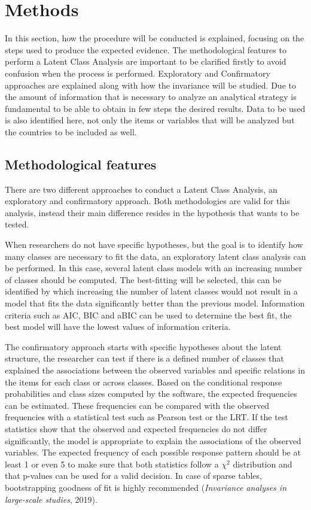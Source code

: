 \documentclass[12pt,a4paper,oneside]{reedthesis}
\begin{document}
\clearpage

\hypertarget{methods}{%
\chapter{Methods}\label{methods}}

In this section, how the procedure will be conducted is explained, focusing on the steps used to produce the expected evidence. The methodological features to perform a Latent Class Analysis are important to be clarified firstly to avoid confusion when the process is performed. Exploratory and Confirmatory approaches are explained along with how the invariance will be studied. Due to the amount of information that is necessary to analyze an analytical strategy is fundamental to be able to obtain in few steps the desired results. Data to be used is also identified here, not only the items or variables that will be analyzed but the countries to be included as well.

\hypertarget{methodological-features}{%
\section{Methodological features}\label{methodological-features}}

There are two different approaches to conduct a Latent Class Analysis, an exploratory and confirmatory approach. Both methodologies are valid for this analysis, instead their main difference resides in the hypothesis that wants to be tested.

When researchers do not have specific hypotheses, but the goal is to identify how many classes are necessary to fit the data, an exploratory latent class analysis can be performed. In this case, several latent class models with an increasing number of classes should be computed. The best-fitting will be selected, this can be identified by which increasing the number of latent classes would not result in a model that fits the data significantly better than the previous model. Information criteria such as AIC, BIC and aBIC can be used to determine the best fit, the best model will have the lowest values of information criteria.

The confirmatory approach starts with specific hypotheses about the latent structure, the researcher can test if there is a defined number of classes that explained the associations between the observed variables and specific relations in the items for each class or across classes. Based on the conditional response probabilities and class sizes computed by the software, the expected frequencies can be estimated. These frequencies can be compared with the observed frequencies with a statistical test such as Pearson test or the LRT. If the test statistics show that the observed and expected frequencies do not differ significantly, the model is appropriate to explain the associations of the observed variables. The expected frequency of each possible response pattern should be at least 1 or even 5 to make sure that both statistics follow a \(\chi^2\) distribution and that p-values can be used for a valid decision. In case of sparse tables, bootstrapping goodness of fit is highly recommended (\emph{Invariance analyses in large-scale studies}, 2019).
\end{document}
